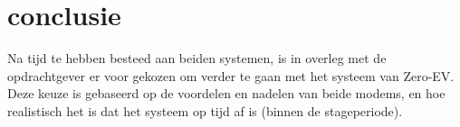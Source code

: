 \section{conclusie}

Na tijd te hebben besteed aan beiden systemen, is in overleg met de
opdrachtgever er voor gekozen om verder te gaan met het systeem van Zero-EV.
Deze keuze is gebaseerd op de voordelen en nadelen van beide modems, en hoe
realistisch het is dat het systeem op tijd af is (binnen de stageperiode).

